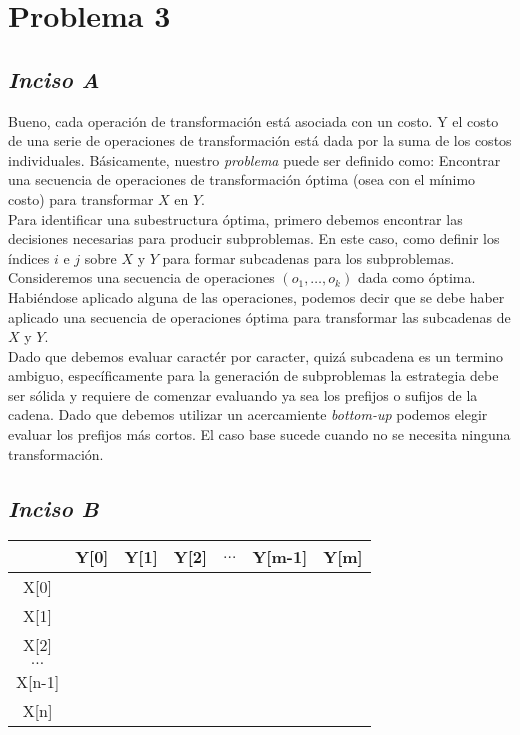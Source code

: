 \section*{Problema 3}

\subsection*{\textit{\textbf{Inciso A}}}
Bueno, cada operación de transformación está asociada con un costo. Y el costo de una serie de operaciones de transformación está dada por la suma de los costos individuales. Básicamente, nuestro \textit{problema} puede ser definido como: Encontrar una secuencia de operaciones de transformación óptima (osea con el mínimo costo) para transformar \(X\) en \(Y\).\\

Para identificar una subestructura óptima, primero debemos encontrar las decisiones necesarias para producir subproblemas. En este caso, como definir los índices \(i\) e \(j\) sobre \(X\) y \(Y\) para formar subcadenas para los subproblemas.\\

Consideremos una secuencia de operaciones \((o_{1},\dots ,o_{k})\) dada como óptima. Habiéndose aplicado alguna de las operaciones, podemos decir que se debe haber aplicado una secuencia de operaciones óptima para transformar las subcadenas de \(X\) y \(Y\). \\

Dado que debemos evaluar caractér por caracter, quizá subcadena es un termino ambiguo, específicamente para la generación de subproblemas la estrategia debe ser sólida y requiere de comenzar evaluando ya sea los prefijos o sufijos de la cadena. Dado que debemos utilizar un acercamiente \textit{bottom-up} podemos elegir evaluar los prefijos más cortos. El caso base sucede cuando no se necesita ninguna transformación.\\

\subsection*{\textit{\textbf{Inciso B}}}

\begin{center}
\begin{tabular}{ c |c |c |c |c |c |c }
     & Y[0] & Y[1] & Y[2] & \(\dots\) & Y[m-1] & Y[m]\\ 
     \hline
    X[0] & & & & & & \\ 
    \hline
    X[1] & & & & & & \\ 
    \hline
    X[2] & & & & & & \\ 
    \hline
    \(\dots\) & & & & & & \\ 
    \hline
    X[n-1] & & & & & & \\ 
    \hline
    X[n] & & & & & & \\ 
\end{tabular}
\end{center}

